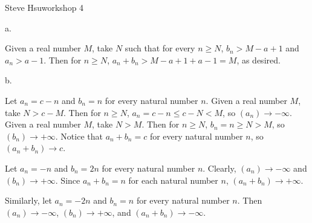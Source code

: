 \centerline{Steve Hsu\hfill workshop 4}
\item{a.}

Given a real number $M$, take $N$ such that
for every $n \ge N$, $b_n > M - a + 1$ and $a_n > a - 1$.
Then for $n \ge N$, $a_n + b_n > M - a + 1 + a - 1 = M$, as desired.
\bigskip
\item{b.}

Let $a_n = c - n$ and $b_n = n$ for every natural number $n$.
Given a real number $M$, take $N > c - M$.
Then for $n \ge N$, $a_n = c - n \le c - N < M$, so $(a_n) \to -\infty$.
Given a real number $M$, take $N > M$.
Then for $n \ge N$, $b_n = n \ge N > M$, so $(b_n) \to +\infty$.
Notice that $a_n + b_n = c$ for every natural number $n$,
so $(a_n + b_n) \to c$.

Let $a_n = -n$ and $b_n = 2n$ for every natural number $n$.
Clearly, $(a_n) \to -\infty$ and $(b_n) \to +\infty$.
Since $a_n + b_n = n$ for each natural number $n$,
$(a_n + b_n) \to +\infty$.

Similarly, let $a_n = -2n$ and $b_n = n$ for every natural number $n$.
Then $(a_n) \to -\infty$, $(b_n) \to +\infty$, and $(a_n + b_n) \to -\infty$.
\bye
